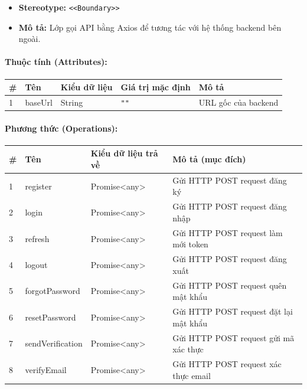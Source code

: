 \documentclass[12pt,a4paper]{article}
\begin{document}
\begin{itemize}[leftmargin=*]
    \item \textbf{Stereotype:} \texttt{\textless{}\textless{}Boundary\textgreater{}\textgreater{}}
    \item \textbf{Mô tả:} Lớp gọi API bằng Axios để tương tác với hệ thống backend bên ngoài.
\end{itemize}

\paragraph{Thuộc tính (Attributes):}
\begin{longtable}{|p{0.6cm}|p{3.5cm}|p{2.4cm}|p{1.8cm}|p{5.1cm}|}
\hline
\textbf{\#} & \textbf{Tên} & \textbf{Kiểu dữ liệu} & \textbf{Giá trị mặc định} & \textbf{Mô tả} \\ \hline
\endhead
1 & baseUrl & String & \texttt{""} & URL gốc của backend \\ \hline
\end{longtable}

\paragraph{Phương thức (Operations):}
\begin{longtable}{|p{0.6cm}|p{5.0cm}|p{2.8cm}|p{5.4cm}|}
\hline
\textbf{\#} & \textbf{Tên} & \textbf{Kiểu dữ liệu trả về} & \textbf{Mô tả (mục đích)} \\ \hline
\endhead
1 & register & Promise\textless{}any\textgreater{} & Gửi HTTP POST request đăng ký \\ \hline
2 & login & Promise\textless{}any\textgreater{} & Gửi HTTP POST request đăng nhập \\ \hline
3 & refresh & Promise\textless{}any\textgreater{} & Gửi HTTP POST request làm mới token \\ \hline
4 & logout & Promise\textless{}any\textgreater{} & Gửi HTTP POST request đăng xuất \\ \hline
5 & forgotPassword & Promise\textless{}any\textgreater{} & Gửi HTTP POST request quên mật khẩu \\ \hline
6 & resetPassword & Promise\textless{}any\textgreater{} & Gửi HTTP POST request đặt lại mật khẩu \\ \hline
7 & sendVerification & Promise\textless{}any\textgreater{} & Gửi HTTP POST request gửi mã xác thực \\ \hline
8 & verifyEmail & Promise\textless{}any\textgreater{} & Gửi HTTP POST request xác thực email \\ \hline
\end{longtable}
\end{document}
